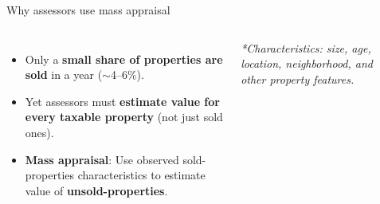 \documentclass[aspectratio=169,12pt,]{beamer}
\newcommand{\1}{\mathbf{1}}
\begin{document}
\begin{frame}{Why assessors use mass appraisal}

\begin{columns}[T,onlytextwidth]


\vspace{1mm}
\begin{itemize}
    \item Only a \textbf{small share of properties are sold} in a year (\(\sim\)4--6\%).
    \medskip

    \item Yet assessors must \textbf{estimate value for every taxable property} (not just sold ones).
    \medskip

    \item \textbf{Mass appraisal}: Use observed sold-properties characteristics to estimate value of \textbf{unsold-properties}.
\end{itemize}

\vspace{2mm}
{\scriptsize \textit{*Characteristics: size, age, location, neighborhood, and other property features.}}


\vspace{3mm}
\centering

\begin{center}
    
\end{center}

\end{columns}


\end{frame}
\end{document}
